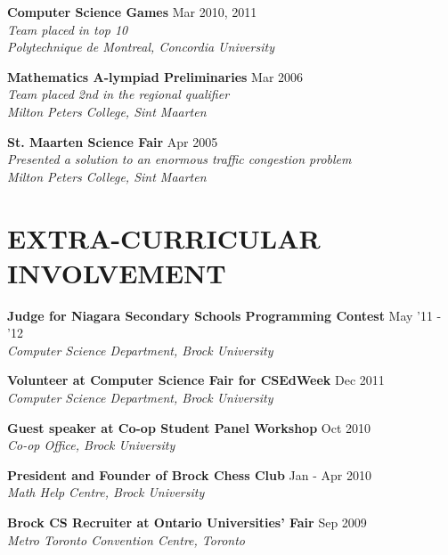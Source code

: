\documentclass[margin]{res}
\begin{document}
\begin{resume}
  \textbf{Computer Science Games} \hfill Mar 2010, 2011 \\
    {\sl Team placed in top 10} \\
    {\sl Polytechnique de Montreal, Concordia University}


  \textbf{Mathematics A-lympiad Preliminaries} \hfill Mar 2006 \\
    {\sl Team placed 2nd in the regional qualifier} \\
    {\sl Milton Peters College, Sint Maarten}

  \textbf{St. Maarten Science Fair} \hfill Apr 2005 \\
    {\sl Presented a solution to an enormous traffic congestion problem} \\
    {\sl Milton Peters College, Sint Maarten}


\section{EXTRA-CURRICULAR \\ INVOLVEMENT}

  \textbf{Judge for Niagara Secondary Schools Programming Contest} \hfill May '11 - '12 \\
    {\sl Computer Science Department, Brock University}

  \textbf{Volunteer at Computer Science Fair for CSEdWeek} \hfill Dec 2011 \\
    {\sl Computer Science Department, Brock University}

  \textbf{Guest speaker at Co-op Student Panel Workshop} \hfill Oct 2010 \\
    {\sl Co-op Office, Brock University}

  \textbf{President and Founder of Brock Chess Club} \hfill Jan - Apr 2010 \\
    {\sl Math Help Centre, Brock University}

  \textbf{Brock CS Recruiter at Ontario Universities' Fair} \hfill Sep 2009 \\
    {\sl Metro Toronto Convention Centre, Toronto}


\end{resume}
\end{document}
